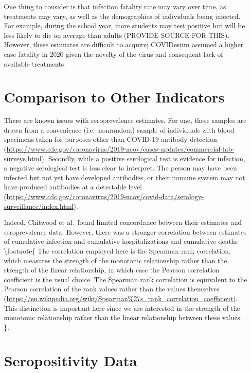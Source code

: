 \documentclass[12pt,twoside]{smiththesis}
\begin{document}
One thing to consider is that infection fatality rate may vary over time, as treatments may vary, as well as the demographics of individuals being infected. For example, during the school year, more students may test positive but will be less likely to die on average than adults (PROVIDE SOURCE FOR THIS). However, these estimates are difficult to acquire; COVIDestim assumed a higher case fatality in 2020 given the novelty of the virus and consequent lack of available treatments.

\hypertarget{comparison-to-other-indicators}{%
\section{Comparison to Other Indicators}\label{comparison-to-other-indicators}}

There are known issues with seroprevalence estimates. For one, these samples are drawn from a convenience (i.e.~nonrandom) sample of individuals with blood specimens taken for purposes other than COVID-19 antibody detection (\url{https://www.cdc.gov/coronavirus/2019-ncov/cases-updates/commercial-lab-surveys.html}). Secondly, while a positive serological test is evidence for infection, a negative serological test is less clear to interpret. The person may have been infected but not yet have developed antibodies, or their immune system may not have produced antibodies at a detectable level (\url{https://www.cdc.gov/coronavirus/2019-ncov/covid-data/serology-surveillance/index.html}).

Indeed, Chitwood et al.~found limited concordance between their estimates and seroprevalence data. However, there was a stronger correlation between estimates of cumulative infection and cumulative hospitalizations and cumulative deaths \textbackslash footnote\{ The correlation employed here is the Spearman rank correlation, which measures the strength of the monotonic relationship rather than the strength of the linear relationship, in which case the Pearson correlation coefficient is the usual choice. The Spearman rank correlation is equivalent to the Pearson correlation of the rank values rather than the values themselves (\url{https://en.wikipedia.org/wiki/Spearman\%27s_rank_correlation_coefficient}). This distinction is important here since we are interested in the strength of the monotonic relationship rather than the linear relationship between these values. \}.

\hypertarget{seropositivity-data}{%
\section{Seropositivity Data}\label{seropositivity-data}}
\end{document}
